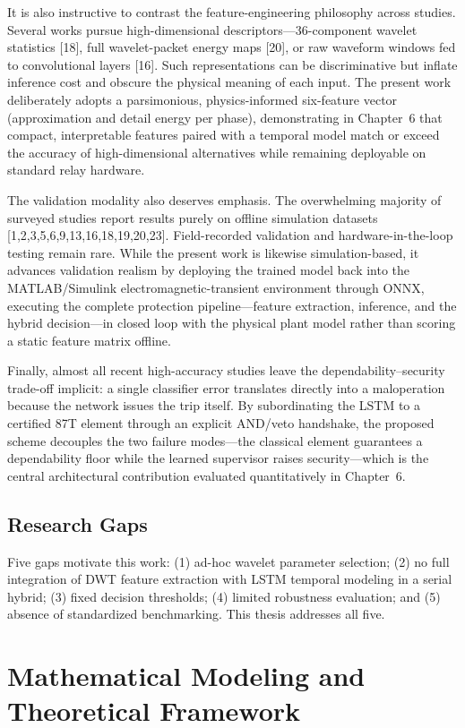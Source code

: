 \documentclass[12pt,a4paper,oneside]{report}
\begin{document}
It is also instructive to contrast the feature-engineering philosophy across studies. Several works pursue high-dimensional descriptors---36-component wavelet statistics [18], full wavelet-packet energy maps [20], or raw waveform windows fed to convolutional layers [16]. Such representations can be discriminative but inflate inference cost and obscure the physical meaning of each input. The present work deliberately adopts a parsimonious, physics-informed six-feature vector (approximation and detail energy per phase), demonstrating in Chapter~6 that compact, interpretable features paired with a temporal model match or exceed the accuracy of high-dimensional alternatives while remaining deployable on standard relay hardware.

The validation modality also deserves emphasis. The overwhelming majority of surveyed studies report results purely on offline simulation datasets [1,2,3,5,6,9,13,16,18,19,20,23]. Field-recorded validation and hardware-in-the-loop testing remain rare. While the present work is likewise simulation-based, it advances validation realism by deploying the trained model back into the MATLAB/Simulink electromagnetic-transient environment through ONNX, executing the complete protection pipeline---feature extraction, inference, and the hybrid decision---in closed loop with the physical plant model rather than scoring a static feature matrix offline.

Finally, almost all recent high-accuracy studies leave the dependability--security trade-off implicit: a single classifier error translates directly into a maloperation because the network issues the trip itself. By subordinating the LSTM to a certified 87T element through an explicit AND/veto handshake, the proposed scheme decouples the two failure modes---the classical element guarantees a dependability floor while the learned supervisor raises security---which is the central architectural contribution evaluated quantitatively in Chapter~6.

\section{Research Gaps}
Five gaps motivate this work: (1) ad-hoc wavelet parameter selection; (2) no full integration of DWT feature extraction with LSTM temporal modeling in a serial hybrid; (3) fixed decision thresholds; (4) limited robustness evaluation; and (5) absence of standardized benchmarking. This thesis addresses all five.

\chapter{Mathematical Modeling and Theoretical Framework}
\end{document}
